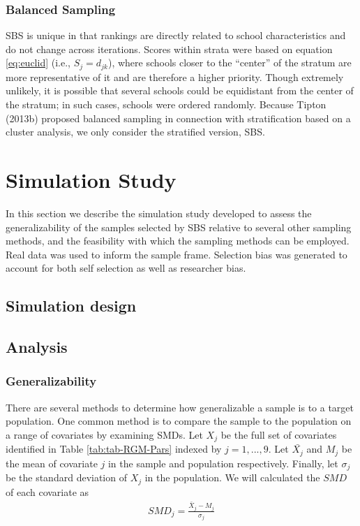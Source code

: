 \documentclass[man,floatsintext]{apa6}
\begin{document}
\hypertarget{balanced-sampling-1}{%
\subsubsection{Balanced Sampling}\label{balanced-sampling-1}}

SBS is unique in that rankings are directly related to school characteristics and do not change across iterations. Scores within strata were based on equation \eqref{eq:euclid} (i.e., \(S_j = d_{jk}\)), where schools closer to the \enquote{center} of the stratum are more representative of it and are therefore a higher priority. Though extremely unlikely, it is possible that several schools could be equidistant from the center of the stratum; in such cases, schools were ordered randomly.
Because Tipton (2013b) proposed balanced sampling in connection with stratification based on a cluster analysis, we only consider the stratified version, SBS.

\hypertarget{simulation-study}{%
\section{Simulation Study}\label{simulation-study}}

In this section we describe the simulation study developed to assess the generalizability of the samples selected by SBS relative to several other sampling methods, and the feasibility with which the sampling methods can be employed. Real data was used to inform the sample frame.
Selection bias was generated to account for both self selection as well as researcher bias.

\hypertarget{simulation-design}{%
\subsection{Simulation design}\label{simulation-design}}

\hypertarget{analysis}{%
\subsection{Analysis}\label{analysis}}

\hypertarget{generalizability}{%
\subsubsection{Generalizability}\label{generalizability}}

There are several methods to determine how generalizable a sample is to a target population. One common method is to compare the sample to the population on a range of covariates by examining SMDs. Let \(X_j\) be the full set of covariates identified in Table \ref{tab:tab-RGM-Pars} indexed by \(j = 1,...,9\). Let \(\bar{X_j}\) and \(M_j\) be the mean of covariate \(j\) in the sample and population respectively. Finally, let \(\sigma_j\) be the standard deviation of \(X_j\) in the population. We will calculated the \(SMD\) of each covariate as
\begin{align}
  SMD_{j} = \frac{\bar{X}_{j}-M_{j}}{\sigma_{j}}
\end{align}
\end{document}
